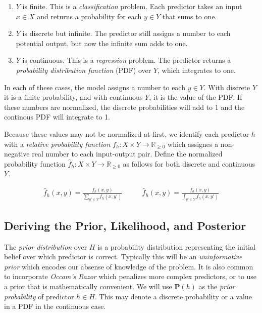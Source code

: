 \documentclass[twoside]{article}
\begin{document}
\begin{enumerate}
	\item \(Y\) is finite. This is a \textit{classification} problem. Each predictor takes an input \(x \in X\) and returns a probability for each \(y \in Y\) that sums to one.
	\item \(Y\) is discrete but infinite. The predictor still assigns a number to each potential output, but now the infinite sum adds to one.
	\item \(Y\) is continuous. This is a \textit{regression} problem. The predictor returns a \textit{probability distribution function} (PDF) over \(Y\), which integrates to one.
\end{enumerate}

In each of these cases, the model assigns a number to each \(y \in Y\). With discrete \(Y\) it is a finite probability, and with continuous \(Y\), it is the value of the PDF. If these numbers are normalized, the discrete probabilities will add to 1 and the continous PDF will integrate to 1.

Because these values may not be normalized at first, we identify each predictor \(h\) with a \textit{relative probability function} \(f_h: X \times Y \rightarrow \mathbb{R}_{\geq 0}\) which assignes a non-negative real number to each input-output pair. Define the normalized probability function \(\hat{f}_h: X \times Y \rightarrow \mathbb{R}_{\geq 0}\) as follows for both discrete and continuous \(Y\).

\begin{align}
\label{eq:normalized_probability_model}
\hat{f}_h(x, y)=\frac{f_h(x, y)}{\sum_{y' \in Y} f_h(x,y')} &
\qquad\hat{f}_h(x, y)=\frac{f_h(x, y)}{\int_{y' \in Y} f_h(x,y')}
\end{align}

\subsection{Deriving the Prior, Likelihood, and Posterior}

The \textit{prior distribution} over \(H\) is a probability distribution representing the initial belief over which predictor is correct. Typically this will be an \textit{uninformative prior} which encodes our absense of knowledge of the problem. It is also common to incorporate \textit{Occam's Razor} which penalizes more complex predictors, or to use a prior that is mathematically convenient. We will use \(\mathbf{P}(h)\) as the \textit{prior probability} of predictor \(h \in H\). This may denote a discrete probability or a value in a PDF in the continuous case.
\end{document}
